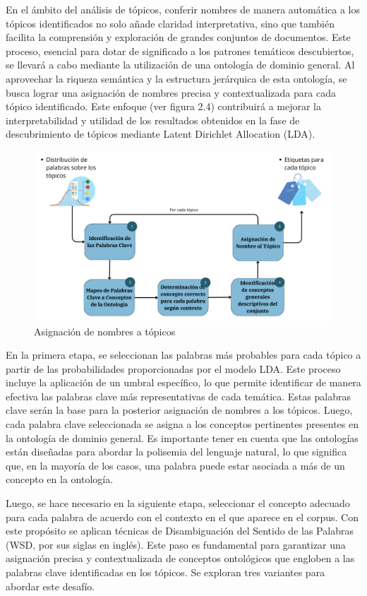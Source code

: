 En el ámbito del análisis de tópicos, conferir nombres de manera automática a los t\'opicos identificados no solo añade claridad interpretativa, sino que también facilita la comprensión y exploración de grandes conjuntos de documentos. Este proceso, esencial para dotar de significado a los patrones temáticos descubiertos, se llevará a cabo mediante la utilización de una ontología de dominio general. Al aprovechar la riqueza semántica y la estructura jerárquica de esta ontología, se busca lograr una asignación de nombres precisa y contextualizada para cada tópico identificado. Este enfoque (ver figura 2.4) contribuirá a mejorar la interpretabilidad y utilidad de los resultados obtenidos en la fase de descubrimiento de tópicos mediante Latent Dirichlet Allocation (LDA).

\begin{figure}[H]
	\centering
	\includegraphics[width=15cm]{topic_naming}
	\caption{Asignaci\'on de nombres a t\'opicos}
\end{figure}

En la primera etapa, se seleccionan las palabras más probables para cada tópico a partir de las probabilidades proporcionadas por el modelo LDA. Este proceso incluye la aplicación de un umbral específico, lo que permite identificar de manera efectiva las palabras clave más representativas de cada temática. Estas palabras clave serán la base para la posterior asignación de nombres a los tópicos. Luego, cada palabra clave seleccionada se asigna a los conceptos pertinentes presentes en la ontología de dominio general. Es importante tener en cuenta que las ontologías están diseñadas para abordar la polisemia del lenguaje natural, lo que significa que, en la mayoría de los casos, una palabra puede estar asociada a más de un concepto en la ontología.

Luego, se hace necesario en la siguiente etapa, seleccionar el concepto adecuado para cada palabra de acuerdo con el contexto en el que aparece en el corpus. Con este prop\'osito se aplican técnicas de Disambiguación del Sentido de las Palabras (WSD, por sus siglas en inglés). Este paso es fundamental para garantizar una asignación precisa y contextualizada de conceptos ontológicos que engloben a las palabras clave identificadas en los tópicos. Se exploran tres variantes para abordar este desafío.

